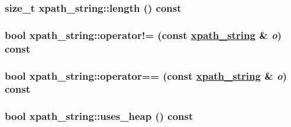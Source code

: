 \hypertarget{classxpath__string_1238d6fdad0766a21965cfeb668f5a5b}{
\subsubsection[length]{\setlength{\rightskip}{0pt plus 5cm}size\_\-t xpath\_\-string::length () const}}
\label{classxpath__string_1238d6fdad0766a21965cfeb668f5a5b}


\hypertarget{classxpath__string_fca32de44459a6805b90c517d5d5ab75}{
\subsubsection[operator"!=]{\setlength{\rightskip}{0pt plus 5cm}bool xpath\_\-string::operator!= (const \hyperlink{classxpath__string}{xpath\_\-string} \& {\em o}) const}}
\label{classxpath__string_fca32de44459a6805b90c517d5d5ab75}


\hypertarget{classxpath__string_42fc30d8b2434d89e724436f99458abd}{
\subsubsection[operator==]{\setlength{\rightskip}{0pt plus 5cm}bool xpath\_\-string::operator== (const \hyperlink{classxpath__string}{xpath\_\-string} \& {\em o}) const}}
\label{classxpath__string_42fc30d8b2434d89e724436f99458abd}


\hypertarget{classxpath__string_c8cab48475690223df758e5ab2368533}{
\subsubsection[uses\_\-heap]{\setlength{\rightskip}{0pt plus 5cm}bool xpath\_\-string::uses\_\-heap () const}}
\label{classxpath__string_c8cab48475690223df758e5ab2368533}




